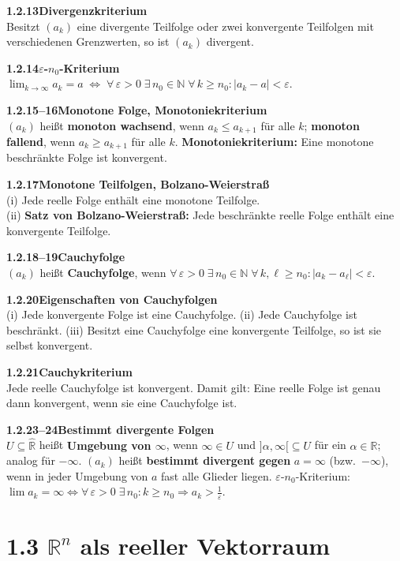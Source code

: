 \documentclass[a4paper,12pt]{article}
\newcommand{\gentry}[3]{%
  \noindent\textbf{#1\quad #2}\nopagebreak\\[0.2em]
  #3\par\smallskip
}
\begin{document}
\gentry{1.2.13}{Divergenzkriterium}{%
  Besitzt $(a_k)$ eine divergente Teilfolge oder zwei konvergente Teilfolgen mit
  verschiedenen Grenzwerten, so ist $(a_k)$ divergent.
}

\gentry{1.2.14}{$\varepsilon$-$n_0$-Kriterium}{%
  $\lim_{k \to \infty} a_k = a \;\Longleftrightarrow\;
  \forall\,\varepsilon > 0\;\exists\,n_0 \in \mathbb{N}\;\forall\,k \geq n_0: |a_k - a| < \varepsilon$.
}

\gentry{1.2.15--16}{Monotone Folge, Monotoniekriterium}{%
  $(a_k)$ heißt \textbf{monoton wachsend}, wenn $a_k \leq a_{k+1}$ für alle $k$;
  \textbf{monoton fallend}, wenn $a_k \geq a_{k+1}$ für alle $k$.
  \textbf{Monotoniekriterium:} Eine monotone beschränkte Folge ist konvergent.
}

\gentry{1.2.17}{Monotone Teilfolgen, Bolzano-Weierstraß}{%
  (i) Jede reelle Folge enthält eine monotone Teilfolge.\\
  (ii) \textbf{Satz von Bolzano-Weierstraß:} Jede beschränkte reelle Folge
  enthält eine konvergente Teilfolge.
}

\gentry{1.2.18--19}{Cauchyfolge}{%
  $(a_k)$ heißt \textbf{Cauchyfolge}, wenn
  $\forall\,\varepsilon > 0\;\exists\,n_0 \in \mathbb{N}\;\forall\,k,\ell \geq n_0: |a_k - a_\ell| < \varepsilon$.
}

\gentry{1.2.20}{Eigenschaften von Cauchyfolgen}{%
  (i) Jede konvergente Folge ist eine Cauchyfolge.
  (ii) Jede Cauchyfolge ist beschränkt.
  (iii) Besitzt eine Cauchyfolge eine konvergente Teilfolge, so ist sie selbst konvergent.
}

\gentry{1.2.21}{Cauchykriterium}{%
  Jede reelle Cauchyfolge ist konvergent. Damit gilt: Eine reelle Folge ist genau
  dann konvergent, wenn sie eine Cauchyfolge ist.
}

\gentry{1.2.23--24}{Bestimmt divergente Folgen}{%
  $U \subseteq \widehat{\mathbb{R}}$ heißt \textbf{Umgebung von $\infty$}, wenn $\infty \in U$ und
  $]{\alpha, \infty[} \subseteq U$ für ein $\alpha \in \mathbb{R}$; analog für $-\infty$.
  $(a_k)$ heißt \textbf{bestimmt divergent gegen} $a = \infty$ (bzw.\ $-\infty$),
  wenn in jeder Umgebung von $a$ fast alle Glieder liegen.
  $\varepsilon$-$n_0$-Kriterium: $\lim a_k = \infty \Leftrightarrow \forall\,\varepsilon > 0\;\exists\,n_0:
  k \geq n_0 \Rightarrow a_k > \frac{1}{\varepsilon}$.
}

\section*{1.3 \quad $\mathbb{R}^n$ als reeller Vektorraum}
\end{document}
